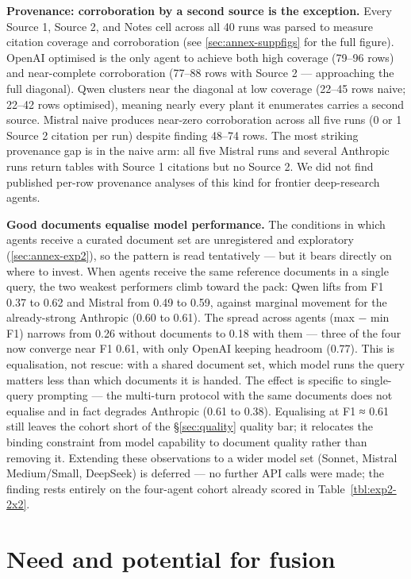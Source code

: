 \documentclass[a4paper,11pt]{article}
\begin{document}
\textbf{Provenance: corroboration by a second source is the exception.}
Every Source 1, Source 2, and Notes cell across all 40 runs was parsed
to measure citation coverage and corroboration (see
\ref{sec:annex-suppfigs} for the full figure). OpenAI optimised is the
only agent to achieve both high coverage (79--96 rows) and near-complete
corroboration (77--88 rows with Source 2 --- approaching the full
diagonal). Qwen clusters near the diagonal at low coverage (22--45 rows
naive; 22--42 rows optimised), meaning nearly every plant it enumerates
carries a second source. Mistral naive produces near-zero corroboration
across all five runs (0 or 1 Source 2 citation per run) despite finding
48--74 rows. The most striking provenance gap is in the naive arm: all
five Mistral runs and several Anthropic runs return tables with Source 1
citations but no Source 2. We did not find published per-row provenance
analyses of this kind for frontier deep-research agents.

\textbf{Good documents equalise model performance.} The conditions in
which agents receive a curated document set are unregistered and
exploratory (\ref{sec:annex-exp2}), so the pattern is read tentatively
--- but it bears directly on where to invest. When agents receive the
same reference documents in a single query, the two weakest performers
climb toward the pack: Qwen lifts from F1 0.37 to 0.62 and Mistral from
0.49 to 0.59, against marginal movement for the already-strong Anthropic
(0.60 to 0.61). The spread across agents (max − min F1) narrows from
0.26 without documents to 0.18 with them --- three of the four now
converge near F1 0.61, with only OpenAI keeping headroom (0.77). This is
equalisation, not rescue: with a shared document set, which model runs
the query matters less than which documents it is handed. The effect is
specific to single-query prompting --- the multi-turn protocol with the
same documents does not equalise and in fact degrades Anthropic (0.61 to
0.38). Equalising at F1 ≈ 0.61 still leaves the cohort short of the
§\ref{sec:quality} quality bar; it relocates the binding constraint from
model capability to document quality rather than removing it. Extending
these observations to a wider model set (Sonnet, Mistral Medium/Small,
DeepSeek) is deferred --- no further API calls were made; the finding
rests entirely on the four-agent cohort already scored in
Table~\ref{tbl:exp2-2x2}.

\section{Need and potential for fusion}\label{sec:fusion}
\end{document}

